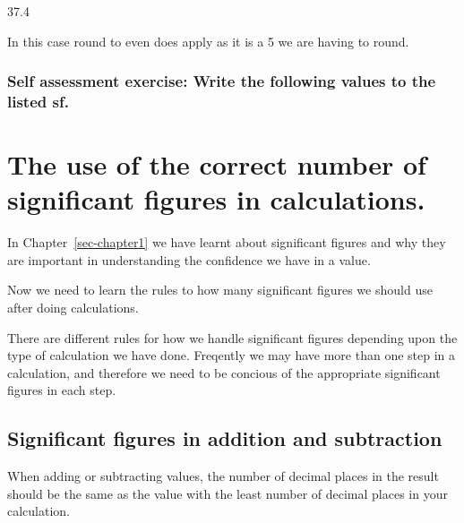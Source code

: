 \documentclass[
  letterpaper,
  DIV=11,
  numbers=noendperiod]{scrreprt}
\begin{document}
\begin{tcolorbox}[enhanced jigsaw, arc=.35mm, bottomrule=.15mm, bottomtitle=1mm, breakable, colback=white, colbacktitle=quarto-callout-note-color!10!white, colframe=quarto-callout-note-color-frame, coltitle=black, left=2mm, leftrule=.75mm, opacityback=0, opacitybacktitle=0.6, rightrule=.15mm, title=\textcolor{quarto-callout-note-color}{\faInfo}\hspace{0.5em}{What is 37.4500 rounded to 3 significant figures?}, titlerule=0mm, toprule=.15mm, toptitle=1mm]

37.4

In this case round to even does apply as it is a 5 we are having to
round.

\end{tcolorbox}

\subsection{Self assessment exercise: Write the following values to the
listed sf.}\label{sec-SAQroundtoeven}


\chapter{The use of the correct number of significant figures in
calculations.}\label{sec-chapter2}

In Chapter~\ref{sec-chapter1} we have learnt about significant figures
and why they are important in understanding the confidence we have in a
value.

Now we need to learn the rules to how many significant figures we should
use after doing calculations.

There are different rules for how we handle significant figures
depending upon the type of calculation we have done. Freqently we may
have more than one step in a calculation, and therefore we need to be
concious of the appropriate significant figures in each step.

\section{Significant figures in addition and
subtraction}\label{sec-sfaddsub}

When adding or subtracting values, the number of decimal places in the
result should be the same as the value with the least number of decimal
places in your calculation.
\end{document}
